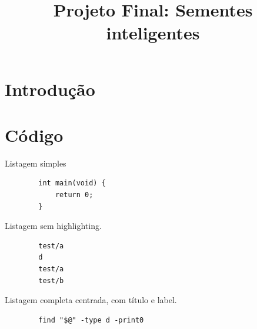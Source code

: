 \documentclass[code,math,final]{relatorio-deti}
\title{Projeto Final: Sementes inteligentes}
\begin{document}
\maketitle

\chapter{Introdução}

\lipsum[1-4]

\chapter{Código}

Listagem simples

\begin{listing}[H]
	\begin{verbatim}
		int main(void) {
			return 0;
		}
	\end{verbatim}
\end{listing}

Listagem sem highlighting.

\begin{listing}[H]
	\begin{verbatim}
		test/a
		d
		test/a
		test/b
	\end{verbatim}
\end{listing}

Listagem completa centrada, com título e label.

\begin{listing}[H]
	\centering
	\begin{verbatim}
        find "$@" -type d -print0
    \end{verbatim}
	\caption{Segunda iteração do comando para obter os subdiretórios}
	\label{code:implementation_second_subdir_find}
\end{listing}
\end{document}
